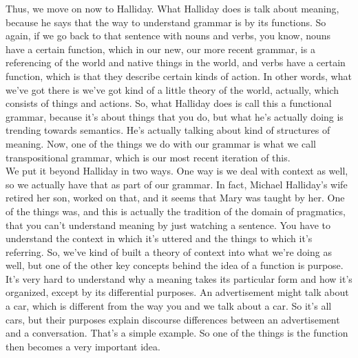 \documentclass[english]{textolivre}
\begin{document}
{    Thus, we move on now to Halliday. What Halliday does is talk about meaning, because he says that the way to understand grammar is by its functions. So again, if we go back to that sentence with nouns and verbs, you know, nouns have a certain function, which in our new, our more recent grammar, is a referencing of the world and native things in the world, and verbs have a certain function, which is that they describe certain kinds of action. In other words, what we’ve got there is we’ve got kind of a little theory of the world, actually, which consists of things and actions. So, what Halliday does is call this a functional grammar, because it’s about things that you do, but what he’s actually doing is trending towards semantics. He’s actually talking about kind of structures of meaning. Now, one of the things we do with our grammar is what we call transpositional grammar, which is our most recent iteration of this.\\
    We put it beyond Halliday in two ways. One way is we deal with context as well, so we actually have that as part of our grammar. In fact, Michael Halliday’s wife retired her son, worked on that, and it seems that Mary was taught by her. One of the things was, and this is actually the tradition of the domain of pragmatics, that you can’t understand meaning by just watching a sentence. You have to understand the context in which it’s uttered and the things to which it’s referring. So, we’ve kind of built a theory of context into what we’re doing as well, but one of the other key concepts behind the idea of a function is purpose. It’s very hard to understand why a meaning takes its particular form and how it’s organized, except by its differential purposes. An advertisement might talk about a car, which is different from the way you and we talk about a car. So it’s all cars, but their purposes explain discourse differences between an advertisement and a conversation. That’s a simple example. So one of the things is the function then becomes a very important idea.\\
}
\end{document}
